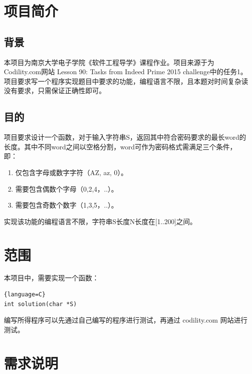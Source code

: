 




% 

\begin{spacing}{1.5}
\songti{}
    \section{项目简介}
    \subsection{背景}
    本项目为南京大学电子学院《软件工程导学》课程作业。项目来源于为Codility.com网站 Lesson 90: Tasks from Indeed Prime 2015 challenge中的任务1。 
    项目要求写一个程序实现题目中要求的功能，编程语言不限，且本题对时间复杂读没有要求，只需保证正确性即可。

    \subsection{目的}
    项目要求设计一个函数，对于输入字符串S，返回其中符合密码要求的最长word的长度。其中不同word之间以空格分割，word可作为密码格式需满足三个条件，即：
    \begin{enumerate} [\indent (1)]
            \item 仅包含字母或数字字符（A\-Z, a\-z, 0）。
            \item 需要包含偶数个字母（0,2,4，..）。
            \item 需要包含奇数个数字（1,3,5，..）。
    \end{enumerate}

    实现该功能的编程语言不限，字符串S长度N长度在[1..200]之间。
    
    \section{范围}
    本项目中，需要实现一个函数：

\begin{lstlisting}{language=C}
int solution(char *S)
\end{lstlisting}

    编写所得程序可以先通过自己编写的程序进行测试，再通过 codility.com 网站进行测试。

    \section{需求说明}

\end{spacing}
